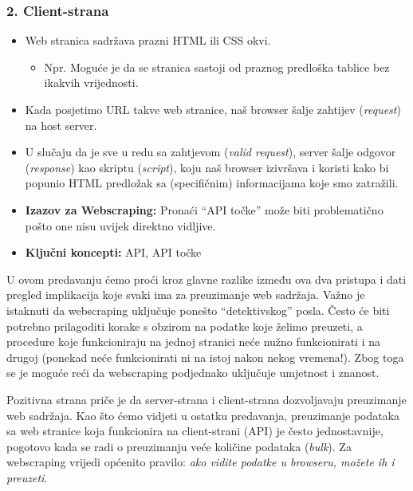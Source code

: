 \documentclass[
]{article}
\providecommand{\tightlist}{%
  \setlength{\itemsep}{0pt}\setlength{\parskip}{0pt}}
\begin{document}
\hypertarget{client-strana}{%
\subsubsection{2. Client-strana}\label{client-strana}}

\begin{itemize}
\tightlist
\item
  Web stranica sadržava prazni HTML ili CSS okvi.

  \begin{itemize}
  \tightlist
  \item
    Npr. Moguće je da se stranica sastoji od praznog predloška tablice
    bez ikakvih vrijednosti.
  \end{itemize}
\item
  Kada posjetimo URL takve web stranice, naš browser šalje zahtijev
  (\emph{request}) na host server.
\item
  U slučaju da je sve u redu sa zahtjevom (\emph{valid request}), server
  šalje odgovor (\emph{response}) kao skriptu (\emph{script}), koju naš
  browser izivršava i koristi kako bi popunio HTML predložak sa
  (specifičnim) informacijama koje smo zatražili.
\item
  \textbf{Izazov za Webscraping:} Pronaći ``API točke'' može biti
  problematično pošto one nisu uvijek direktno vidljive.
\item
  \textbf{Ključni koncepti:} API, API točke
\end{itemize}

U ovom predavanju ćemo proći kroz glavne razlike između ova dva pristupa
i dati pregled implikacija koje svaki ima za preuzimanje web sadržaja.
Važno je istaknuti da webscraping uključuje ponešto ``detektivskog''
posla. Često će biti potrebno prilagoditi korake s obzirom na podatke
koje želimo preuzeti, a procedure koje funkcioniraju na jednoj stranici
neće nužno funkcionirati i na drugoj (ponekad neće funkcionirati ni na
istoj nakon nekog vremena!). Zbog toga se je moguće reći da webscraping
podjednako uključuje umjetnost i znanost.

Pozitivna strana priče je da server-strana i client-strana dozvoljavaju
preuzimanje web sadržaja. Kao što ćemo vidjeti u ostatku predavanja,
preuzimanje podataka sa web stranice koja funkcionira na client-strani
(API) je često jednostavnije, pogotovo kada se radi o preuzimanju veće
količine podataka (\emph{bulk}). Za webscraping vrijedi općenito
pravilo: \emph{ako vidite podatke u browseru, možete ih i preuzeti}.
\end{document}
